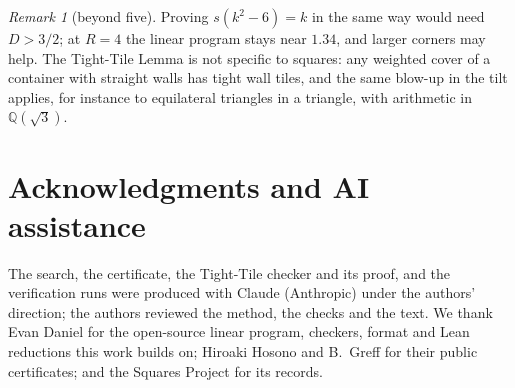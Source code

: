 \documentclass[11pt]{amsart}
\theoremstyle{definition}
\theoremstyle{remark}
\newtheorem{remark}[theorem]{Remark}
\begin{document}
\begin{remark}[beyond five]
Proving $s(k^2-6)=k$ in the same way would need $D>3/2$; at $R=4$ the linear program stays near $1.34$, and larger
corners may help. The Tight-Tile Lemma is not specific to squares: any weighted cover of a container with straight
walls has tight wall tiles, and the same blow-up in the tilt applies, for instance to equilateral triangles in a
triangle, with arithmetic in $\mathbb Q(\sqrt3)$.
\end{remark}

\section*{Acknowledgments and AI assistance}
The search, the certificate, the Tight-Tile checker and its proof, and the verification runs were produced with
Claude (Anthropic) under the authors' direction; the authors reviewed the method, the checks and the text. We
thank Evan Daniel for the open-source linear program, checkers, format and Lean reductions this work builds on;
Hiroaki Hosono and B.~Greff for their public certificates; and the Squares Project for its records.
\end{document}
